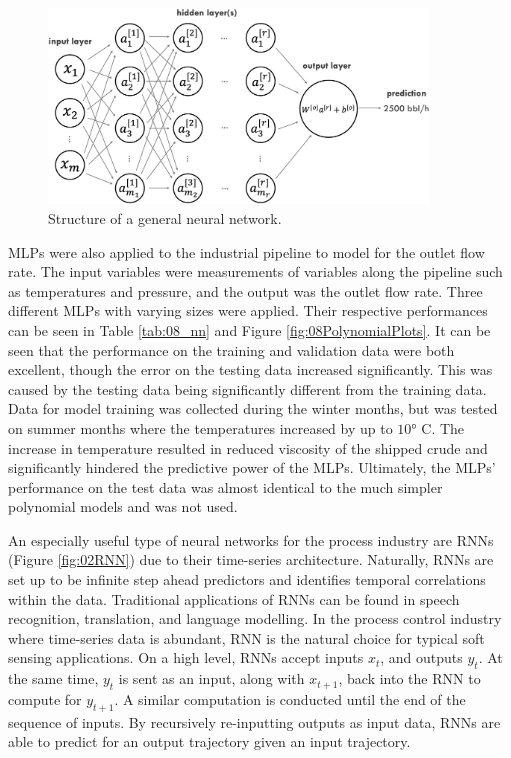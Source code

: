 \begin{figure}[h]
    \centering
    \includegraphics[width=0.9\textwidth]{images/suncor/08NN.png}
    \caption{Structure of a general neural network.}
    \label{fig:02MLP}
\end{figure}

MLPs were also applied to the industrial pipeline to model for the outlet flow rate. The input variables were measurements of variables along the pipeline such as temperatures and pressure, and the output was the outlet flow rate. Three different MLPs with varying sizes were applied.  Their respective performances can be seen in Table \ref{tab:08_nn} and Figure \ref{fig:08PolynomialPlots}.  It can be seen that the performance on the training and validation data were both excellent, though the error on the testing data increased significantly.  This was caused by the testing data being significantly different from the training data.  Data for model training was collected during the winter months, but was tested on summer months where the temperatures increased by up to $\ang{10}$ C. The increase in temperature resulted in reduced viscosity of the shipped crude and significantly hindered the predictive power of the MLPs. Ultimately, the MLPs' performance on the test data was almost identical to the much simpler polynomial models and was not used.

An especially useful type of neural networks for the process industry are RNNs (Figure \ref{fig:02RNN}) due to their time-series architecture.  Naturally, RNNs are set up to be infinite step ahead predictors and identifies temporal correlations within the data.  Traditional applications of RNNs can be found in speech recognition, translation, and language modelling.  In the process control industry where time-series data is abundant, RNN is the natural choice for typical soft sensing applications.  On a high level, RNNs accept inputs $x_t$, and outputs $y_t$.  At the same time, $y_t$ is sent as an input, along with $x_{t+1}$, back into the RNN to compute for $y_{t+1}$.  A similar computation is conducted until the end of the sequence of inputs.  By recursively re-inputting outputs as input data, RNNs are able to predict for an output trajectory given an input trajectory.

